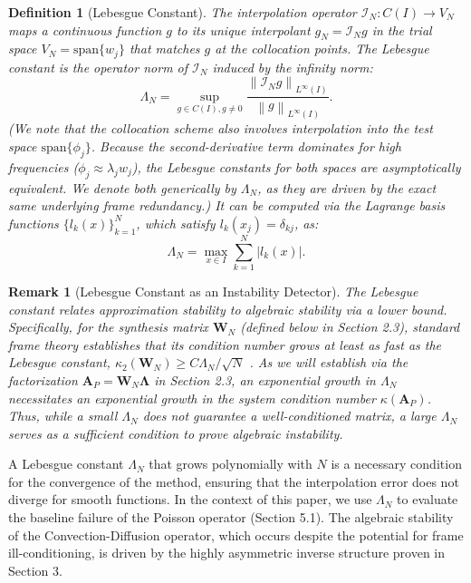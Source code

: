 \documentclass[pdflatex,sn-mathphys-num]{sn-jnl}%
\theoremstyle{thmstyleone}%
\newtheorem{definition}{Definition}
\newtheorem{remark}{Remark}
\newcommand{\norm}[1]{\left\lVert#1\right\rVert}
\newcommand{\abs}[1]{\left\lvert#1\right\rvert}
\newcommand{\mat}[1]{\mathbf{#1}}
\begin{document}
\begin{definition}[Lebesgue Constant]
The interpolation operator $\mathcal{I}_N: C(I) \to V_N$ maps a continuous function $g$ to its unique interpolant $g_N = \mathcal{I}_N g$ in the trial space $V_N = \text{span}\{w_j\}$ that matches $g$ at the collocation points. The Lebesgue constant is the operator norm of $\mathcal{I}_N$ induced by the infinity norm:
\begin{equation}
\Lambda_N = \sup_{g \in C(I), g \ne 0} \frac{\norm{\mathcal{I}_N g}_{L^\infty(I)}}{\norm{g}_{L^\infty(I)}}.
\end{equation}
(We note that the collocation scheme also involves interpolation into the test space $\text{span}\{\phi_j\}$. Because the second-derivative term dominates for high frequencies ($\phi_j \approx \lambda_j w_j$), the Lebesgue constants for both spaces are asymptotically equivalent. We denote both generically by $\Lambda_N$, as they are driven by the exact same underlying frame redundancy.)
It can be computed via the Lagrange basis functions $\{l_k(x)\}_{k=1}^N$, which satisfy $l_k(x_j) = \delta_{kj}$, as:
\begin{equation}
\Lambda_N = \max_{x \in I} \sum_{k=1}^N \abs{l_k(x)}.
\end{equation}
\end{definition}

\begin{remark}[Lebesgue Constant as an Instability Detector]
\label{rem:lebesgue_condition_link}
The Lebesgue constant relates approximation stability to algebraic stability via a lower bound. Specifically, for the synthesis matrix $\mat{W}_N$ (defined below in Section 2.3), standard frame theory establishes that its condition number grows at least as fast as the Lebesgue constant, $\kappa_2(\mat{W}_N) \ge C \Lambda_N / \sqrt{N}$ \citep{adcock2014numerical}. As we will establish via the factorization $\mat{A}_P = \mat{W}_N\mathbf{\Lambda}$ in Section 2.3, an exponential growth in $\Lambda_N$ necessitates an exponential growth in the system condition number $\kappa(\mat{A}_P)$. Thus, while a small $\Lambda_N$ does not guarantee a well-conditioned matrix, a large $\Lambda_N$ serves as a sufficient condition to prove algebraic instability.
\end{remark}

A Lebesgue constant $\Lambda_N$ that grows polynomially with $N$ is a necessary condition for the convergence of the method, ensuring that the interpolation error does not diverge for smooth functions. In the context of this paper, we use $\Lambda_N$ to evaluate the baseline failure of the Poisson operator (Section 5.1). The algebraic stability of the Convection-Diffusion operator, which occurs despite the potential for frame ill-conditioning, is driven by the highly asymmetric inverse structure proven in Section 3.
\end{document}
